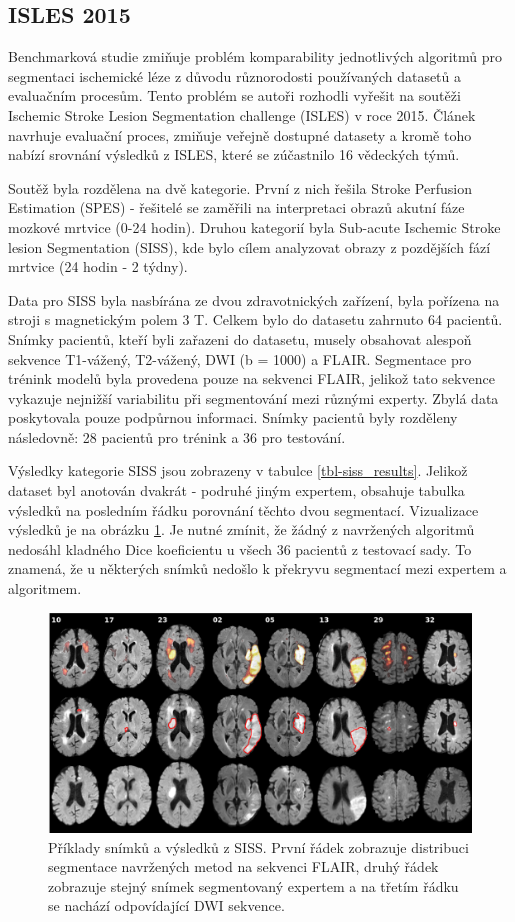 \documentclass[11pt]{article}
\begin{document}
\subsection{ISLES 2015}
Benchmarková studie \cite{Maier2016} zmiňuje problém komparability jednotlivých algoritmů pro segmentaci ischemické léze z důvodu různorodosti používaných datasetů a evaluačním procesům. Tento problém se autoři rozhodli vyřešit na soutěži Ischemic Stroke Lesion Segmentation challenge (ISLES) v roce 2015. Článek navrhuje evaluační proces, zmiňuje veřejně dostupné datasety a kromě toho nabízí srovnání výsledků z ISLES, které se zúčastnilo 16 vědeckých týmů.

Soutěž byla rozdělena na dvě kategorie. První z nich řešila Stroke Perfusion Estimation (SPES) - řešitelé se zaměřili na interpretaci obrazů akutní fáze mozkové mrtvice (0-24 hodin). Druhou kategorií byla Sub-acute Ischemic Stroke lesion Segmentation (SISS), kde bylo cílem analyzovat obrazy z pozdějších fází mrtvice (24 hodin - 2 týdny).

Data pro SISS byla nasbírána ze dvou zdravotnických zařízení, byla pořízena na stroji s magnetickým polem 3 T. Celkem bylo do datasetu zahrnuto 64 pacientů. Snímky pacientů, kteří byli zařazeni do datasetu, musely obsahovat alespoň sekvence T1-vážený, T2-vážený, DWI (b = 1000) a FLAIR. Segmentace pro trénink modelů byla provedena pouze na sekvenci FLAIR, jelikož tato sekvence vykazuje nejnižší variabilitu při segmentování mezi různými experty. Zbylá data poskytovala pouze podpůrnou informaci. Snímky pacientů byly rozděleny následovně: 28 pacientů pro trénink a 36 pro testování.

Výsledky kategorie SISS jsou zobrazeny v tabulce \ref{tbl-siss_results}. Jelikož dataset byl anotován dvakrát - podruhé jiným expertem, obsahuje tabulka výsledků na posledním řádku porovnání těchto dvou segmentací. Vizualizace výsledků je na obrázku \ref{img-isles2015}. Je nutné zmínit, že žádný z navržených algoritmů nedosáhl kladného Dice koeficientu u všech 36 pacientů z testovací sady. To znamená, že u některých snímků nedošlo k překryvu segmentací mezi expertem a algoritmem.

\begin{figure}[htp]
	\centering
	\includegraphics[width=\textwidth]{isles2015}
	\caption{Příklady snímků a výsledků z SISS. První řádek zobrazuje distribuci segmentace navržených metod na sekvenci FLAIR, druhý řádek zobrazuje stejný snímek segmentovaný expertem a na třetím řádku se nachází odpovídající DWI sekvence.}
	\label{img-isles2015}
\end{figure}
\end{document}
